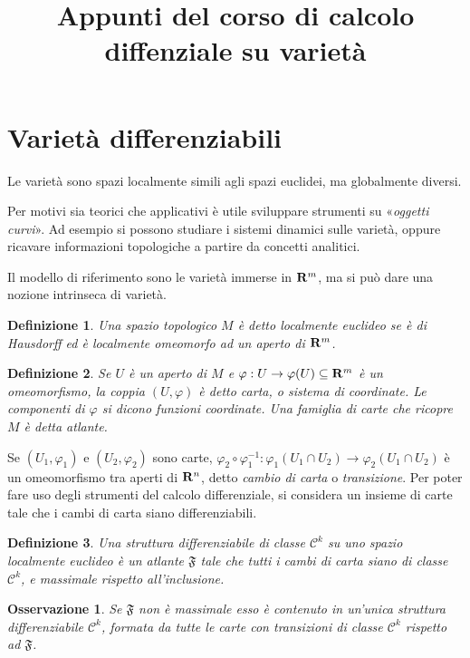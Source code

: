 \documentclass{article}
\title{ Appunti del corso di calcolo diffenziale su varietà}
\author{}
\date{}
\newcommand{\PHI}{\varphi}
\newcommand{\incluso}{\subseteq}
\newcommand{\composto}{\circ}
\newcommand{\inv}{^{-1}}
\newcommand{\cors}[1]{\textit{#1}}%
\newcommand{\ci}[1]{\mathscr{#1}}%
\newcommand{\g}[1]{\mathfrak{#1}}
\newtheorem{definizione}{ Definizione}
\newtheorem{oss}{ Osservazione}
\begin{document}
 \maketitle

\section{ Varietà differenziabili}

 
 
 Le varietà sono spazi localmente simili agli spazi euclidei, ma globalmente diversi.
 
 Per motivi sia teorici che applicativi è utile sviluppare strumenti su «\cors{oggetti curvi}».
 Ad esempio si possono studiare i sistemi dinamici sulle varietà, oppure ricavare
 informazioni topologiche a partire da concetti analitici.
 
 Il modello di riferimento sono le varietà immerse in ${\bf R }^m$, ma si può dare
 una nozione intrinseca di varietà.
 
 \begin{definizione}
 Una spazio topologico $M$ è detto localmente euclideo se è
 di Hausdorff ed è localmente omeomorfo ad un aperto di ${ \bf R}^m$.
 \end{definizione}
 
 \begin{definizione}
 Se $U$ è un aperto di $M$ e $\PHI:U\to \PHI(U)\incluso {\bf R}^m$
 è un omeomorfismo, la coppia $(U, \PHI)$ è detto carta, o sistema di coordinate.
 Le componenti di $\PHI$ si dicono funzioni coordinate. Una famiglia di carte
 che ricopre $M$ è detta atlante.
 \end{definizione}
 
 Se $(U_1, \PHI_1)$ e $(U_2, \PHI_2)$ sono carte, $\PHI_2\composto\PHI_1\inv:\PHI_1(U_1\cap U_2)\to\PHI_2(U_1\cap U_2)$
 è un omeomorfismo tra aperti di ${\bf  R}^n$, detto \cors{cambio di carta} o \cors{transizione}.
 Per poter fare uso degli strumenti del calcolo differenziale, si considera un insieme
 di carte tale che i cambi di carta siano differenziabili.
 
 \begin{definizione}
 Una \cors{struttura differenziabile} di classe $\ci{C}^k$ su uno
 spazio localmente euclideo è un atlante $\g{F}$ tale che tutti i cambi di carta siano
 di classe $\ci{C}^k$, e massimale rispetto all'inclusione.
 \end{definizione}
 
 \begin{oss}
  Se $\g{F}$ non è massimale esso è contenuto in un'unica struttura differenziabile $\ci{C}^k$,
  formata da tutte le carte con transizioni di classe $\ci{C}^k$ rispetto ad $\g{F}$.
 \end{oss}
 
\end{document}
